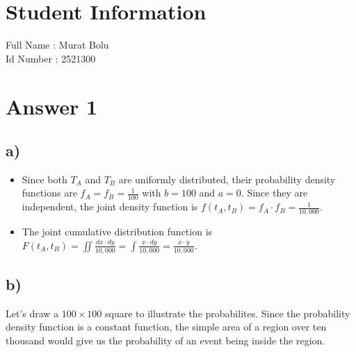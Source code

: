 \documentclass[12pt]{article}
\begin{document}
\section*{Student Information } 
Full Name : Murat Bolu \\
Id Number : 2521300 \\

\section*{Answer 1}

\subsection*{a)}

\begin{itemize}
  \item Since both $T_A$ and $T_B$ are uniformly distributed, their probability
  density functions are $f_A = f_B = \frac{1}{100}$ with $b = 100$ and $a = 0$.
  Since they are independent, the joint density function is $f(t_A, t_B) = f_A
  \cdot f_B = \frac{1}{10,000}$.
  \item The joint cumulative distribution function is $F(t_A, t_B) = \iint
  \frac{dx \cdot dy}{10,000} = \int \frac{x \cdot dy}{10,000} = \frac{x \cdot
  y}{10,000}$.
\end{itemize}

\subsection*{b)}

Let's draw a $100 \times 100$ square to illustrate the probabilites. Since the
probability density function is a constant function, the simple area of a region
over ten thousand would give us the probability of an event being inside the
region.

\begin{center}
\end{center}
\end{document}
